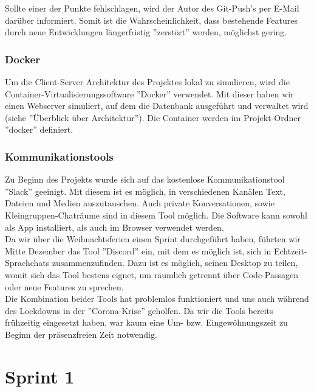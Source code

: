 \documentclass[twoside]{report}
\begin{document}
Sollte einer der Punkte fehlschlagen, wird der Autor des Git-Push's per E-Mail
darüber informiert. Somit ist die Wahrscheinlichkeit, dass bestehende Features durch
neue Entwicklungen längerfristig ''zerstört'' werden, möglichst gering.

\subsubsection{Docker}
Um die Client-Server Architektur des Projektes lokal zu simulieren, wird die
Container-Virtualisierungssoftware ''Docker'' verwendet.
Mit dieser haben wir einen Webserver simuliert, auf dem die Datenbank ausgeführt
und verwaltet wird (siehe ''Überblick über Architektur''). Die Container werden
im Projekt-Ordner ''docker'' definiert.


\subsubsection{Kommunikationstools}
Zu Beginn des Projekts wurde sich auf das kostenlose Kommunikationstool ''Slack'' geeinigt.
Mit diesem ist es möglich, in verschiedenen Kanälen Text, Dateien und Medien auszutauschen.
Auch private Konversationen, sowie Kleingruppen-Chaträume sind in diesem Tool möglich.
Die Software kann sowohl als App installiert, als auch im Browser verwendet werden.
\\Da wir über die Weihnachtsferien einen Sprint durchgeführt haben, führten wir Mitte Dezember
das Tool ''Discord'' ein, mit dem es möglich ist, sich in Echtzeit-Sprachchats zusammenzufinden.
Dazu ist es möglich, seinen Desktop zu teilen, womit sich das Tool bestens eignet,
um räumlich getrennt über Code-Passagen oder neue Features zu sprechen.
\\Die Kombination beider Tools hat problemlos funktioniert und uns auch
während des Lockdowns in der ''Corona-Krise'' geholfen. Da wir die Tools bereits frühzeitig
eingesetzt haben, war kaum eine Um- bzw. Eingewöhnungszeit zu Beginn der
präsenzfreien Zeit notwendig.


\newpage


\section{Sprint 1}



\newpage
\end{document}
